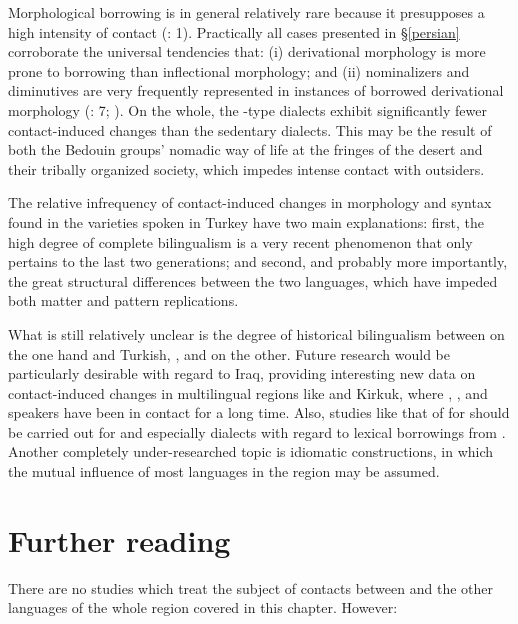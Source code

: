 \documentclass[output=paper]{langsci/langscibook}
\begin{document}
Morphological borrowing is in general relatively rare because it presupposes a high intensity of contact (\citealt{GardaniArkadievAmiridze2015}: 1). Practically all cases presented in §\ref{persian} corroborate the universal tendencies that: (i) {derivational} morphology is more prone to borrowing than {inflectional} morphology; and (ii) nominalizers and diminutives are very frequently represented in instances of borrowed {derivational} morphology (\citealt{GardaniArkadievAmiridze2015}: 7; \citealt{Seifart2013}). On the whole, the -type dialects exhibit significantly fewer contact-induced changes than the sedentary dialects. This may be the result of both the Bedouin groups' nomadic way of life at the fringes of the desert and their tribally organized society, which impedes intense contact with outsiders.

The {relative} infrequency of contact-induced changes in morphology and syntax found in the  varieties spoken in Turkey have two main explanations: first, the high degree of complete {bilingualism} is a very recent phenomenon that only pertains to the last two generations; and second, and probably more importantly, the great structural differences between the two languages, which have impeded both matter and pattern replications.

What is still relatively unclear is the degree of historical {bilingualism} between  on the one hand and  {Turkish}, , and  on the other. Future research would be particularly desirable with regard to Iraq, providing interesting new data on contact-induced changes in multilingual regions like  and Kirkuk, where , , and  speakers have been in contact for a long time. Also, studies like that of  \citet{Neishtadt2015} for  should be carried out for  and especially  dialects with regard to lexical borrowings from . Another completely under-researched topic is {idiomatic} constructions, in which the mutual influence of most languages in the region may be assumed.\pagebreak

\section*{Further reading}
There are no studies which treat the subject of contacts between  and the other languages of the whole region covered in this chapter. However:
\end{document}
